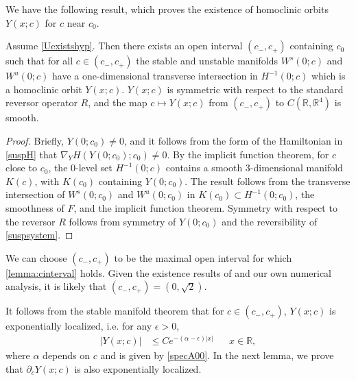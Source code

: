 \documentclass[review,onefignum,onetabnum]{siamart171218}
\newcommand{\R}{\mathbb{R}}
\begin{document}
We have the following result, which proves the existence of homoclinic orbits $Y(x; c)$ for $c$ near $c_0$.
\begin{lemma}\label{lemma:cinterval}
Assume \cref{Uexistshyp}. Then there exists an open interval $(c_-, c_+)$ containing $c_0$ such that for all $c \in (c_-, c_+)$ the stable and unstable manifolds $W^s(0; c)$ and $W^u(0; c)$ have a one-dimensional transverse intersection in $H^{-1}(0; c)$ which is a homoclinic orbit $Y(x; c)$. $Y(x; c)$ is symmetric with respect to the standard reversor operator $R$, and the map $c \mapsto Y(x; c)$ from $(c_-, c_+)$ to $C(\R, \R^4)$ is smooth.
\end{lemma}
\begin{proof}
Briefly, $Y(0; c_0) \neq 0$, and it follows from the form of the Hamiltonian in \cref{suspH} that $\nabla_Y H(Y(0; c_0); c_0) \neq 0$. By the implicit function theorem, for $c$ close to $c_0$, the 0-level set $H^{-1}(0; c)$ contains a smooth 3-dimensional manifold $K(c)$, with $K(c_0)$ containing $Y(0; c_0)$. The result follows from the transverse intersection of $W^s(0; c_0)$ and $W^u(0; c_0)$ in $K(c_0) \subset H^{-1}(0; c_0)$, the smoothness of $F$, and the implicit function theorem. Symmetry with respect to the reversor $R$ follows from symmetry of $Y(0; c_0)$ and the reversibility of \cref{suspsystem}.
\end{proof}

\begin{remark}We can choose $(c_-, c_+)$ to be the maximal open interval for which \cref{lemma:cinterval} holds. Given the existence results of \cite{Smets2002,Berg2018} and our own numerical analysis, it is likely that $(c_-, c_+) = (0, \sqrt{2})$.
\end{remark}

It follows from the stable manifold theorem that for $c \in (c_-, c_+)$, $Y(x; c)$ is exponentially localized, i.e. for any $\epsilon > 0$,
\begin{align}\label{Yexploc}
|Y(x; c)| &\leq C e^{-(\alpha - \epsilon)|x|} && x \in \R,
\end{align}
where $\alpha$ depends on $c$ and is given by \cref{specA00}. In the next lemma, we prove that $\partial_c Y(x; c)$ is also exponentially localized.
\end{document}
